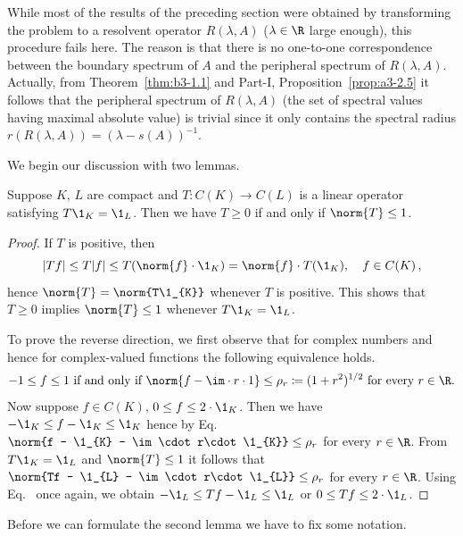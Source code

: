 While most of the results of the preceding section were obtained by transforming the problem to a resolvent operator $R(\lambda,A)$ ($\lambda \in \R$ large enough), this procedure fails here.
The reason is that there is no one-to-one correspondence between the boundary spectrum of\/ $A$ and the peripheral spectrum of\/ $R(\lambda,A)$.
Actually, from Theorem~\ref{thm:b3-1.1} and Part-I, Proposition~\ref{prop:a3-2.5} it follows that the peripheral spectrum of\/ $R(\lambda,A)$ (\ie the set of spectral values having maximal absolute value) is trivial since it only contains the spectral radius $r(R(\lambda,A)) = (\lambda - s(A))^{-1}$.

We begin our discussion with two lemmas.
\begin{lemma}\label{lem:b3-2.1}
	Suppose $K$, $L$ are compact and $T \colon C(K) \to C(L)$ is a linear operator satisfying $T \1_{K} = \1_{L}$.
	Then we have $T \geq 0$ if and only if\/ $\norm{T} \leq 1$.
\end{lemma}
\begin{proof}
	If\/ $T$ is positive, then
	\begin{equation}\label{eq:b3-2.1}
	|Tf| \leq T|f| \leq T(\norm{f}\cdot \1_{K}) = \norm{f}\cdot T(\1_{K}), \quad f \in C(K)\,,
	\end{equation}
	hence $\norm{T} = \norm{T\1_{K}}$ whenever $T$ is positive.
	This shows that $T \geq 0$ implies $\norm{T} \leq 1$ whenever $T\1_{K} = \1_{L}$.
	
	To prove the reverse direction, we first observe that for complex numbers and hence for complex-valued functions the following equivalence holds.
	\begin{equation}\label{eq:b3-2.2}
	-1 \leq f \leq 1 \text{ if and only if } \norm{f - \im\cdot r\cdot 1} \leq \rho_{r} \coloneqq (1+r^{2})^{1/2} \text{ for every } r \in \R.
	\end{equation}
	Now suppose $f \in C(K)$, $0 \leq f \leq 2\cdot \1_{K}$.
	Then we have $-\1_{K} \leq f - \1_{K} \leq \1_{K}$ hence by Eq.~ $\norm{f - \1_{K} - \im\cdot r\cdot \1_{K}} \leq \rho_{r}$ for every $r \in \R$.
	From $T\1_{K} = \1_{L}$ and $\norm{T} \leq 1$ it follows that $\norm{Tf - \1_{L} - \im\cdot r\cdot \1_{L}} \leq \rho_{r}$ for every $r \in \R$.
	Using Eq.~ once again, we obtain $-\1_{L} \leq Tf - \1_{L} \leq \1_{L}$ or $0 \leq Tf \leq 2\cdot \1_{L}$.
\end{proof}
Before we can formulate the second lemma we have to fix some notation.
